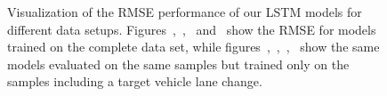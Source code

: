 \begin{figure}[th!]
{    }
    \caption{Visualization of the \ac{RMSE} performance of our \ac{LSTM} models for different data setups.
    Figures~\protect{},~\protect{},~\protect{} and~\protect{} show the \ac{RMSE} for models trained on the complete data set, while
figures~\protect{},~\protect{},~\protect{},~\protect{} show the same models evaluated on the same samples but trained only on the samples including a target vehicle lane change.}
    \label{fig:rmse_on_board_training_data_variation}
\end{figure}

